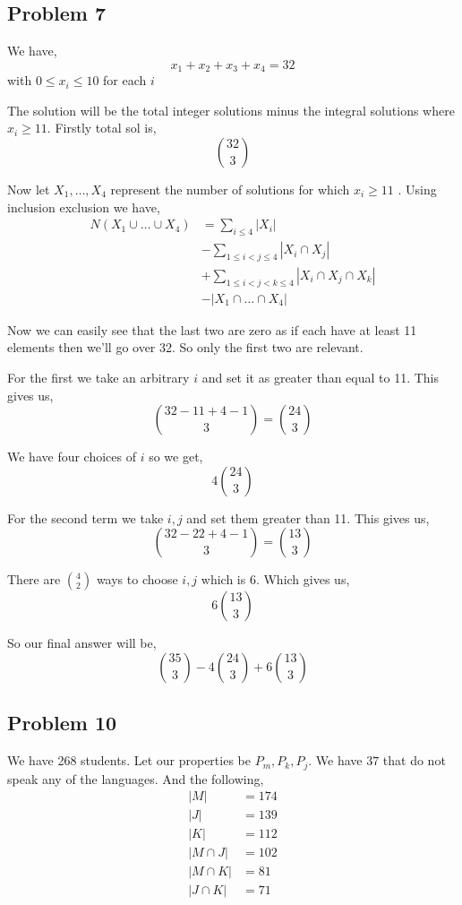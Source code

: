 \documentclass[a4paper]{report}
\begin{document}
\subsection*{Problem 7}
We have, 
$$ x_1 + x_2 + x_3 + x_4 = 32 $$ with $0 \le x_i \le 10$ for each $i$

The solution will be the total integer solutions minus the integral solutions where $x_i \ge 11$. Firstly total sol is,  
$$ {32}  \choose {3}$$ 


Now let $X_1,\dots,X_4$ represent the number of solutions for which $x_i \ge 11$ . Using inclusion exclusion we have,  
\begin{align*}
    N(X_1 \cup \dots \cup X_4) &= \sum_{i \le 4} |X_i|\\
                               &-  \sum_{1 \le i < j \le 4} |X_i \cap X_j|\\
                               &+ \sum_{1 \le i < j < k \le 4} |X_i \cap X_j \cap X_k|\\
                               &- |X_1 \cap \dots \cap X_4|
\end{align*}

Now we can easily see that the last two are zero as if each have at least 11 elements then we'll go over 32. So only the first two are relevant.

For the first we take an arbitrary $i$ and set it as greater than equal to 11. This gives us, 
$$ {32 - 11 + 4 - 1 \choose 3 }= {24 \choose 3 }$$ 

We have four choices of $i$ so we get,  
$$ 4 {24 \choose 3} $$ 

For the second term we take $i,j$ and set them greater than 11. This gives us,  
$$ {32- 22 + 4 - 1 \choose 3} ={ 13 \choose 3 }$$ 

There are $4 \choose 2$ ways to choose  $i,j$ which is  6. Which gives us,  
$$ 6 {13 \choose 3} $$ 

So our final answer will be, 
$$ {35 \choose 3} - 4 {24 \choose 3} + 6 {13 \choose 3} $$ 

\subsection*{Problem 10}
We have 268 students. Let our properties be  $P_m, P_k, P_j$. We have  $37$ that do not speak any of the languages. And the following, 
 \begin{align*}
     |M| &= 174\\
     |J| &= 139\\
     |K| &= 112\\
     |M \cap J| &= 102\\
     |M \cap K| &= 81\\
     |J \cap K| &= 71\\
\end{align*}
\end{document}
